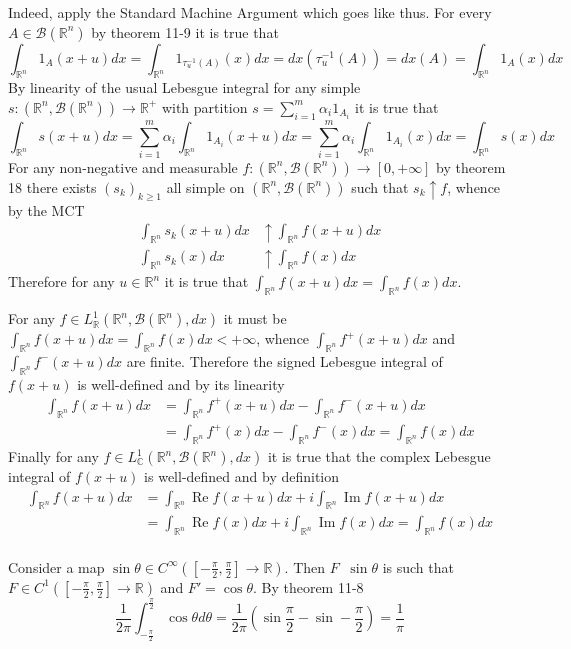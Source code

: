 \documentclass[a4paper]{article}
\newcommand{\clo}[1]{\left [ #1 \right ]}
\newcommand{\brac}[1]{\left ( #1 \right )}
\newcommand{\Real}{\mathbb{R}}
\newcommand{\Zinf}{\clo{ 0, +\infty }}
\newcommand{\Cplx}{\mathbb{C}}
\newcommand{\borel}[1]{\mathcal{B}\brac{#1}}
\newcommand{\defn}{\mathop{\overset{\Delta}{=}}\nolimits}
\newcommand{\re}{\operatorname{Re}\nolimits}
\newcommand{\im}{\operatorname{Im}\nolimits}
\begin{document}
Indeed, apply the Standard Machine Argument which goes like thus. For every $A\in \borel{\Real^n}$ by theorem 11-9 it is true that \[\int_{\Real^n} 1_A\brac{x+u} dx = \int_{\Real^n} 1_{\tau_u^{-1}\brac{A}}\brac{x} dx  = dx\brac{\tau_u^{-1}\brac{A}} = dx\brac{A} = \int_{\Real^n} 1_A\brac{x} dx\] By linearity of the usual Lebesgue integral for any simple $s:\brac{\Real^n, \borel{\Real^n}}\to\Real^+$ with partition $s=\sum_{i=1}^m \alpha_i 1_{A_i}$ it is true that \[\int_{\Real^n} s\brac{x+u} dx = \sum_{i=1}^m \alpha_i \int_{\Real^n} 1_{A_i}\brac{x+u} dx = \sum_{i=1}^m \alpha_i \int_{\Real^n} 1_{A_i}\brac{x} dx = \int_{\Real^n} s\brac{x} dx\] For any non-negative and measurable $f:\brac{\Real^n, \borel{\Real^n}}\to\Zinf$ by theorem 18 there exists $\brac{s_k}_{k\geq1}$ all simple on $\brac{\Real^n, \borel{\Real^n}}$ such that $s_k\uparrow f$, whence by the MCT \begin{align*}\int_{\Real^n} s_k\brac{x+u} dx &\uparrow \int_{\Real^n} f\brac{x+u} dx\\ \int_{\Real^n} s_k\brac{x} dx &\uparrow \int_{\Real^n} f\brac{x} dx\end{align*} Therefore for any $u\in \Real^n$ it is true that $\int_{\Real^n} f\brac{x+u} dx = \int_{\Real^n} f\brac{x} dx$.

For any $f\in L^1_\Real\brac{\Real^n, \borel{\Real^n}, dx}$ it must be $\int_{\Real^n} f\brac{x+u} dx = \int_{\Real^n} f\brac{x} dx <+\infty$, whence $\int_{\Real^n} f^+\brac{x+u} dx$ and $\int_{\Real^n} f^-\brac{x+u} dx$ are finite. Therefore the signed Lebesgue integral of $f\brac{x+u}$ is well-defined and by its linearity\begin{align*}
\int_{\Real^n} f\brac{x+u} dx &= \int_{\Real^n} f^+\brac{x+u} dx - \int_{\Real^n} f^-\brac{x+u} dx\\&= \int_{\Real^n} f^+\brac{x} dx - \int_{\Real^n} f^-\brac{x} dx = \int_{\Real^n} f\brac{x} dx
\end{align*} Finally for any $f\in L^1_\Cplx\brac{\Real^n, \borel{\Real^n}, dx}$ it is true that the complex Lebesgue integral of $f\brac{x+u}$ is well-defined and by definition \begin{align*}\int_{\Real^n} f\brac{x+u} dx &= \int_{\Real^n} \re f\brac{x+u} dx + i \int_{\Real^n} \im f\brac{x+u} dx\\ &= \int_{\Real^n} \re f\brac{x} dx + i \int_{\Real^n} \im f\brac{x} dx = \int_{\Real^n} f\brac{x} dx\end{align*}\\


Consider a map $\sin \theta \in C^\infty\brac{\clo{-\frac{\pi}{2}, \frac{\pi}{2}}\to\Real}$. Then $F \defn \sin \theta$ is such that $F\in C^1\brac{\clo{-\frac{\pi}{2}, \frac{\pi}{2}}\to\Real}$ and $F' = \cos\theta$. By theorem 11-8 \[\frac{1}{2\pi}\int_{-\frac{\pi}{2}}^\frac{\pi}{2} \cos \theta d\theta = \frac{1}{2\pi}\brac{\sin\frac{\pi}{2} - \sin -\frac{\pi}{2}} = \frac{1}{\pi}\]
\end{document}
